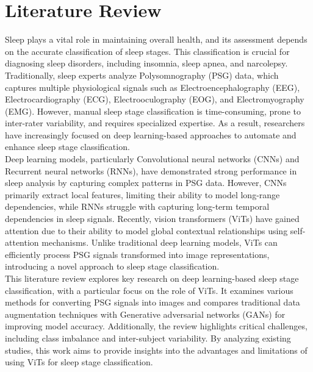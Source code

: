 \chapter{Literature Review}

Sleep plays a vital role in maintaining overall health, and its assessment depends on the accurate classification of sleep stages. This classification is crucial for diagnosing sleep disorders, including insomnia, sleep apnea, and narcolepsy. Traditionally, sleep experts analyze Polysomnography (PSG) data, which captures multiple physiological signals such as Electroencephalography (EEG), Electrocardiography (ECG), Electrooculography (EOG), and Electromyography (EMG). However, manual sleep stage classification is time-consuming, prone to inter-rater variability, and requires specialized expertise. As a result, researchers have increasingly focused on deep learning-based approaches to automate and enhance sleep stage classification. \\

Deep learning models, particularly Convolutional neural networks (CNNs) and Recurrent neural networks (RNNs), have demonstrated strong performance in sleep analysis by capturing complex patterns in PSG data. However, CNNs primarily extract local features, limiting their ability to model long-range dependencies, while RNNs struggle with capturing long-term temporal dependencies in sleep signals. Recently, vision transformers (ViTs) have gained attention due to their ability to model global contextual relationships using self-attention mechanisms. Unlike traditional deep learning models, ViTs can efficiently process PSG signals transformed into image representations, introducing a novel approach to sleep stage classification. \\

This literature review explores key research on deep learning-based sleep stage classification, with a particular focus on the role of ViTs. It examines various methods for converting PSG signals into images and compares traditional data augmentation techniques with Generative adversarial networks (GANs) for improving model accuracy. Additionally, the review highlights critical challenges, including class imbalance and inter-subject variability. By analyzing existing studies, this work aims to provide insights into the advantages and limitations of using ViTs for sleep stage classification.

